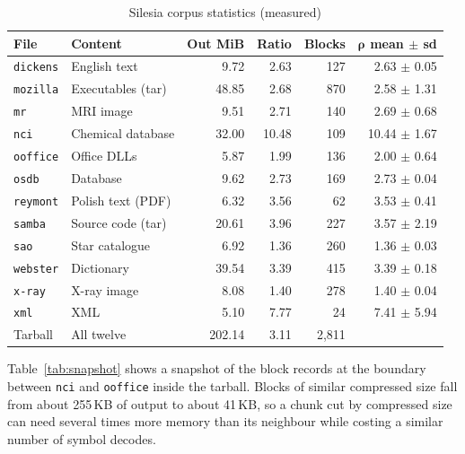 \documentclass[conference]{IEEEtran}
\begin{document}
\begin{table}[t]
\caption{Silesia corpus statistics (measured)}
\label{tab:silesia}
\centering
\footnotesize
\setlength{\tabcolsep}{3pt}
\begin{tabular}{@{}llrrrr@{}}
\toprule
\textbf{File} & \textbf{Content} & \textbf{Out MiB} & \textbf{Ratio} & \textbf{Blocks} & $\boldsymbol{\rho}$ \textbf{mean $\pm$ sd} \\
\midrule
\texttt{dickens} & English text      &  9.72 &  2.63 & 127 &  2.63 $\pm$ 0.05 \\
\texttt{mozilla} & Executables (tar) & 48.85 &  2.68 & 870 &  2.58 $\pm$ 1.31 \\
\texttt{mr}      & MRI image         &  9.51 &  2.71 & 140 &  2.69 $\pm$ 0.68 \\
\texttt{nci}     & Chemical database & 32.00 & 10.48 & 109 & 10.44 $\pm$ 1.67 \\
\texttt{ooffice} & Office DLLs       &  5.87 &  1.99 & 136 &  2.00 $\pm$ 0.64 \\
\texttt{osdb}    & Database          &  9.62 &  2.73 & 169 &  2.73 $\pm$ 0.04 \\
\texttt{reymont} & Polish text (PDF) &  6.32 &  3.56 &  62 &  3.53 $\pm$ 0.41 \\
\texttt{samba}   & Source code (tar) & 20.61 &  3.96 & 227 &  3.57 $\pm$ 2.19 \\
\texttt{sao}     & Star catalogue    &  6.92 &  1.36 & 260 &  1.36 $\pm$ 0.03 \\
\texttt{webster} & Dictionary        & 39.54 &  3.39 & 415 &  3.39 $\pm$ 0.18 \\
\texttt{x-ray}   & X-ray image       &  8.08 &  1.40 & 278 &  1.40 $\pm$ 0.04 \\
\texttt{xml}     & XML               &  5.10 &  7.77 &  24 &  7.41 $\pm$ 5.94 \\
\midrule
Tarball          & All twelve        & 202.14 & 3.11 & 2{,}811 & \\
\bottomrule
\end{tabular}
\end{table}

Table~\ref{tab:snapshot} shows a snapshot of the block records at the boundary
between \texttt{nci} and \texttt{ooffice} inside the tarball. Blocks of similar
compressed size fall from about 255\,KB of output to about 41\,KB, so a chunk
cut by compressed size can need several times more memory than its neighbour
while costing a similar number of symbol decodes.
\end{document}

